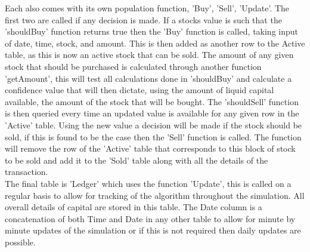 \documentclass[12pt,a4paper]{article}
\begin{document}
Each also comes with its own population function, 'Buy', 'Sell', 'Update'. The first two are called if any decision is made. If a stocks value is such that the 'shouldBuy' function returns true then the 'Buy' function is called, taking input of date, time, stock, and amount. This is then added as another row to the Active table, as this is now an active stock that can be sold. The amount of any given stock that should be purchased is calculated through another function 'getAmount', this will test all calculations done in 'shouldBuy' and calculate a confidence value that will then dictate, using the amount of liquid capital available, the amount of the stock that will be bought. The 'shouldSell' function is then queried every time an updated value is available for any given row in the 'Active' table. Using the new value a decision will be made if the stock should be sold, if this is found to be the case then the 'Sell' function is called. The function will remove the row of the 'Active' table that corresponds to this block of stock to be sold and add it to the 'Sold' table along with all the details of the transaction. \\

The final table is 'Ledger' which uses the function 'Update', this is called on a regular basis to allow for tracking of the algorithm throughout the simulation. All overall details of capital are stored in this table. The Date column is a concatenation of both Time and Date in any other table to allow for minute by minute updates of the simulation or if this is not required then daily updates are possible.
\end{document}
